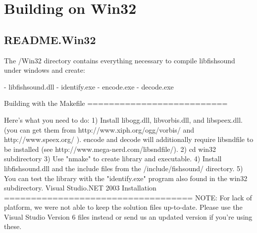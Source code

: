 \section{Building on Win32}
\label{group__win32}
\subsection{R\-E\-A\-D\-M\-E.\-Win32}\label{group__win32_win32}

\begin{DoxyCodeInclude}
The /Win32 directory contains everything necessary to compile
libfishsound under windows and create:

- libfishsound.dll
- identify.exe
- encode.exe
- decode.exe

Building with the Makefile
==========================

Here\textcolor{stringliteral}{'s what you need to do:}
\textcolor{stringliteral}{}
\textcolor{stringliteral}{1) Install libogg.dll, libvorbis.dll, and libspeex.dll.}
\textcolor{stringliteral}{   (you can get them from http://www.xiph.org/ogg/vorbis/ }
\textcolor{stringliteral}{    and http://www.speex.org/ ). encode and decode will}
\textcolor{stringliteral}{   additionally require libsndfile to be installed (see}
\textcolor{stringliteral}{   http://www.mega-nerd.com/libsndfile/).}
\textcolor{stringliteral}{}
\textcolor{stringliteral}{2) cd win32 subdirectory}
\textcolor{stringliteral}{}
\textcolor{stringliteral}{3) Use "nmake" to create library and executable.}
\textcolor{stringliteral}{}
\textcolor{stringliteral}{4) Install libfishsound.dll and the include files from the}
\textcolor{stringliteral}{   /include/fishsound/ directory.}
\textcolor{stringliteral}{}
\textcolor{stringliteral}{5) You can test the library with the "identify.exe" program}
\textcolor{stringliteral}{   also found in the win32 subdirectory.}
\textcolor{stringliteral}{}
\textcolor{stringliteral}{}
\textcolor{stringliteral}{Visual Studio.NET 2003 Installation}
\textcolor{stringliteral}{===================================}
\textcolor{stringliteral}{NOTE: For lack of platform, we were not able to keep the solution}
\textcolor{stringliteral}{files up-to-date. Please use the Visual Studio Version 6 files}
\textcolor{stringliteral}{instead or send us an updated version if you'}re \textcolor{keyword}{using} these.



\end{DoxyCodeInclude}
